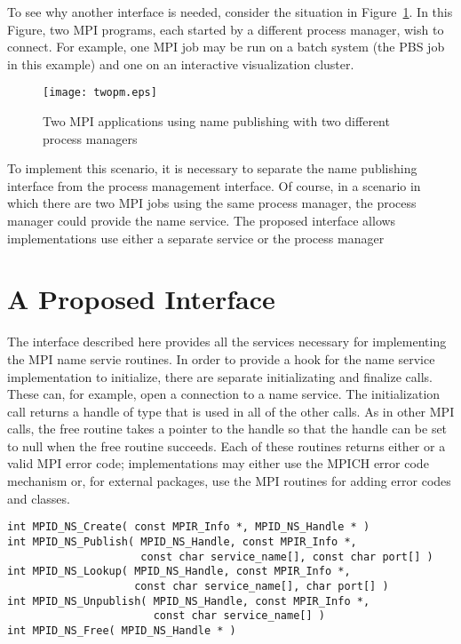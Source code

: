 \documentclass{article}
\begin{document}
To see why another interface is needed, consider the situation in
Figure~\ref{fig:multiple-pm}.  In this Figure, two MPI programs, each
started by a different process manager, wish to connect.  For example,
one MPI job may be run on a batch system (the PBS job in this example)
and one on an interactive visualization cluster.

\begin{figure}
\centerline{\texttt{[image: twopm.eps]}}
\caption{Two MPI applications using name publishing with two different
process managers}\label{fig:multiple-pm}
\end{figure}

To implement this scenario, it is necessary to separate the name
publishing interface from the process management interface.  
Of course, in a scenario in which there are two MPI jobs using the
same process manager, the process manager could provide the name
service.  The proposed interface allows implementations use either a
separate service or the process manager

\section{A Proposed Interface}
\label{sec:name-interface}

The interface described here provides all the services necessary for
implementing the MPI name servie routines.  In order to provide a hook
for the name service implementation to initialize, there are separate
initializating and finalize calls.  These can, for example, open a
connection to a name service.  The initialization call returns a
handle of type  that is used in all of the other
calls.  As in other MPI calls, the free routine takes a pointer to the
handle so that the handle can be set to null when the free routine
succeeds.  Each of these routines returns either  or
a valid MPI error code; implementations may either use the MPICH
error code mechanism or, for external packages, use the MPI routines
for adding error codes and classes.

\begin{verbatim}
int MPID_NS_Create( const MPIR_Info *, MPID_NS_Handle * )
int MPID_NS_Publish( MPID_NS_Handle, const MPIR_Info *,
                     const char service_name[], const char port[] )
int MPID_NS_Lookup( MPID_NS_Handle, const MPIR_Info *,
                    const char service_name[], char port[] )
int MPID_NS_Unpublish( MPID_NS_Handle, const MPIR_Info *,
                       const char service_name[] )
int MPID_NS_Free( MPID_NS_Handle * )
\end{verbatim}
\end{document}
